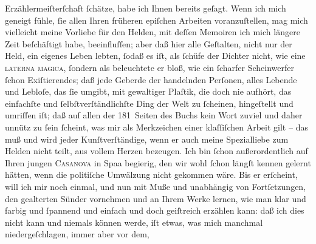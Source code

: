 \begin{ledgroupsized}[t]{13cm}
                    Erzählermeiſterſchaft ſchätze, habe ich Ihnen bereits geſagt. Wenn ich mich
                    geneigt fühle, ſie allen Ihren früheren epiſchen Arbeiten voranzuſtellen, mag
                    mich vielleicht meine Vorliebe für den Helden, mit deſſen Memoiren ich mich
                    längere Zeit beſchäftigt habe, beeinfluſſen; aber daß hier alle Geſtalten, nicht
                    nur der Held, ein eigenes Leben lebten, ſodaß es iſt, als ſchüfe der Dichter
                    nicht, wie eine \textsc{laterna magica}, ſondern als
                    beleuchtete er bloß, wie ein ſcharfer Scheinwerfer ſchon Exiſtierendes; daß jede
                    Geberde der handelnden Perſonen, alles {\pb}Lebende und Lebloſe, das ſie umgibt,
                    mit gewaltiger Plaſtik, die doch nie aufhört, das einfachſte und
                    ſelbſtverſtändlichſte Ding der Welt zu ſcheinen, hingeſtellt und umriſſen iſt;
                    daß auf allen der 181 Seiten des Buchs kein Wort zuviel und daher unnütz zu ſein ſcheint, was mir als
                    Merkzeichen einer klaſſiſchen Arbeit gilt – das muß und wird jeder
                    Kunſtverſtändige, wenn er auch meine Spezialliebe zum Helden nicht teilt, aus
                    vollem Herzen bezeugen. Ich bin ſchon außerordentlich auf Ihren jungen \textsc{Casanova} in Spaa begierig, den wir wohl ſchon längſt kennen gelernt hätten, wenn die
                    politiſche Umwälzung nicht gekommen wäre. Bis er erſcheint, will ich mir noch
                    einmal, und nun mit Muße und unabhängig von Fortſetzungen, den gealterten Sünder
                    vornehmen und an Ihrem Werke lernen, wie man klar und farbig und ſpannend und
                    einfach und doch geiſtreich erzählen kann: daß ich dies nicht kann und niemals
                    können werde, iſt etwas, was mich manchmal niedergeſchlagen, immer aber vor dem,

\end{ledgroupsized}
